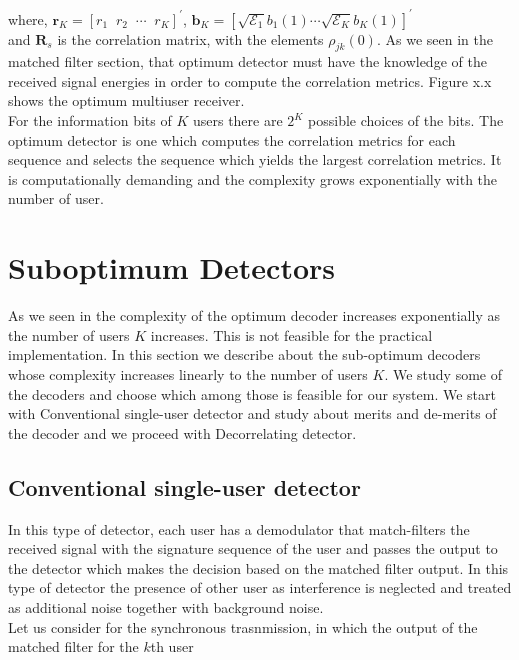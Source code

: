 where, $\mathrm{\mathbf{r}}_K=[r_1\;\;r_2\;\;\cdots\;\;r_K]^{'}$,\hspace{10mm} $\mathrm{\mathbf{b}}_K=[\sqrt{\mathcal{E}_1}b_1(1)\cdots\sqrt{\mathcal{E}_K}b_K(1)]^{'}$ \\

and $\mathrm{\mathbf{R}}_s$ is the correlation matrix, with the elements $\rho_{jk}(0)$. As we seen in the matched filter section, that optimum detector must have the knowledge of the received signal energies in order to compute the correlation metrics. Figure x.x shows the optimum multiuser receiver. \\

For the information bits of $K$ users there are $2^K$ possible choices of the bits. The optimum detector is one which computes the correlation metrics for each sequence and selects the sequence which yields the largest correlation metrics. It is computationally demanding and the complexity grows exponentially with the number of user.

\section{Suboptimum Detectors}
As we seen in the complexity of the optimum decoder increases exponentially as the number of users $K$ increases. This is not feasible for the practical implementation. In this section we describe about the sub-optimum decoders whose complexity increases linearly to the number of users $K$. We study some of the decoders and choose which among those is feasible for our system. We start with Conventional single-user detector and study about merits and de-merits of the decoder and we proceed with Decorrelating detector. \\

\subsection{Conventional single-user detector}
In this type of detector, each user has a demodulator that match-filters the received signal with the signature sequence of the user and passes the output to the detector which makes the decision based on the matched filter output. In this type of detector the presence of other user as interference is neglected and treated as additional noise together with background noise. \\ 

Let us consider for the synchronous trasnmission, in which the output of the matched filter for the $k$th user

